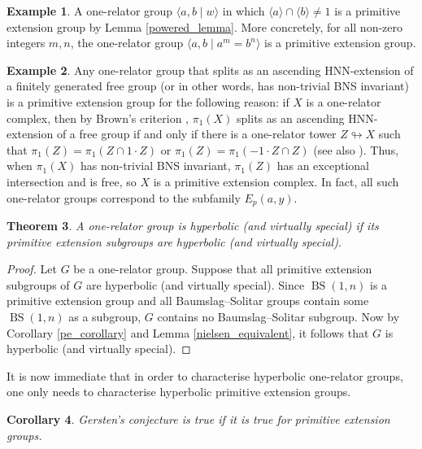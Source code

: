 \documentclass[11pt, a4paper]{amsart}
\newtheorem{theorem}{Theorem}[section]
\newtheorem{corollary}[theorem]{Corollary}
\theoremstyle{definition}
\newtheorem{example}[theorem]{Example}
\def\immerses{\looparrowright}
\DeclareMathOperator{\bs}{BS}
\begin{document}
\begin{example}
A one-relator group $\langle a, b \mid w \rangle$ in which $\langle a\rangle\cap \langle b\rangle\neq 1$ is a primitive extension group by Lemma \ref{powered_lemma}. More concretely, for all non-zero integers $m, n$, the one-relator group $\langle a, b \mid a^m = b^n\rangle$ is a primitive extension group.
\end{example}

\begin{example}
\label{ascending_example}
Any one-relator group that splits as an ascending HNN-extension of a finitely generated free group (or in other words, has non-trivial BNS invariant) is a primitive extension group for the following reason: if $X$ is a one-relator complex, then by Brown's criterion \cite{brown_87}, $\pi_1(X)$ splits as an ascending HNN-extension of a free group if and only if there is a one-relator tower $Z\immerses X$ such that $\pi_1(Z) = \pi_1(Z\cap 1\cdot Z)$ or $\pi_1(Z) = \pi_1(-1\cdot Z\cap Z)$ (see also \cite[Section 5.3]{me_22}). Thus, when $\pi_1(X)$ has non-trivial BNS invariant, $\pi_1(Z)$ has an exceptional intersection and is free, so $X$ is a primitive extension complex. In fact, all such one-relator groups correspond to the subfamily $E_{p}(a, y)$.
\end{example}


\begin{theorem}
\label{main}
A one-relator group is hyperbolic (and virtually special) if its primitive extension subgroups are hyperbolic (and virtually special).
\end{theorem}

\begin{proof}
Let $G$ be a one-relator group. Suppose that all primitive extension subgroups of $G$ are hyperbolic (and virtually special). Since $\bs(1, n)$ is a primitive extension group and all Baumslag--Solitar groups contain some $\bs(1, n)$ as a subgroup, $G$ contains no Baumslag--Solitar subgroup. Now by Corollary \ref{pe_corollary} and Lemma \ref{nielsen_equivalent}, it follows that $G$ is hyperbolic (and virtually special).
\end{proof}

It is now immediate that in order to characterise hyperbolic one-relator groups, one only needs to characterise hyperbolic primitive extension groups.

\begin{corollary}
\label{gersten_corollary}
Gersten's conjecture is true if it is true for primitive extension groups.
\end{corollary}





\end{document}
